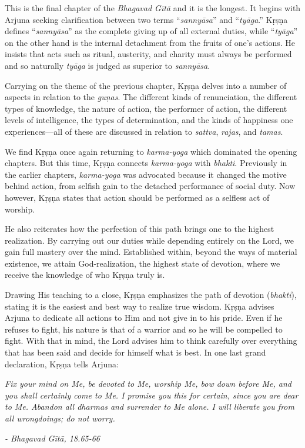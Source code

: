 \documentclass[12pt, twoside, openright]{memoir}
\begin{document}
This is the final chapter of the \textit{Bhagavad Gītā} and it is the longest. It begins with Arjuna seeking clarification between two terms \enquote{\textit{sannyāsa}} and \enquote{\textit{tyāga}.} Kṛṣṇa defines \enquote{\textit{sannyāsa}} as the complete giving up of all external duties, while \enquote{\textit{tyāga}} on the other hand is the internal detachment from the fruits of one’s actions. He insists that acts such as ritual, austerity, and charity must always be performed and so naturally \textit{tyāga} is judged as superior to \textit{sannyāsa}.

Carrying on the theme of the previous chapter, Kṛṣṇa delves into a number of aspects in relation to the \textit{guṇas}. The different kinds of renunciation, the different types of knowledge, the nature of action, the performer of action, the different levels of intelligence, the types of determination, and the kinds of happiness one experiences---all of these are discussed in relation to \textit{sattva}, \textit{rajas}, and \textit{tamas}.

We find Kṛṣṇa once again returning to \textit{karma-yoga} which dominated the opening chapters. But this time, Kṛṣṇa connects \textit{karma-yoga} with \textit{bhakti}. Previously in the earlier chapters, \textit{karma-yoga} was advocated because it changed the motive behind action, from selfish gain to the detached performance of social duty. Now however, Kṛṣṇa states that action should be performed as a selfless act of worship.

He also reiterates how the perfection of this path brings one to the highest realization. By carrying out our duties while depending entirely on the Lord, we gain full mastery over the mind. Established within, beyond the ways of material existence, we attain God-realization, the highest state of devotion, where we receive the knowledge of who Kṛṣṇa truly is.

Drawing His teaching to a close, Kṛṣṇa emphasizes the path of devotion (\textit{bhakti}), stating it is the easiest and best way to realize true wisdom. Kṛṣṇa advises Arjuna to dedicate all actions to Him and not give in to his pride. Even if he refuses to fight, his nature is that of a warrior and so he will be compelled to fight. With that in mind, the Lord advises him to think carefully over everything that has been said and decide for himself what is best. In one last grand declaration, Kṛṣṇa tells Arjuna:

\begin{customquote}\fontsize{10}{11}\selectfont
\textit{Fix your mind on Me, be devoted to Me, worship Me, bow down before Me, and you shall certainly come to Me. I promise you this for certain, since you are dear to Me. Abandon all \textit{dharmas} and surrender to Me alone. I will liberate you from all wrongdoings; do not worry.}

\textit{- Bhagavad Gītā, 18.65-66}
\end{customquote}
\end{document}
